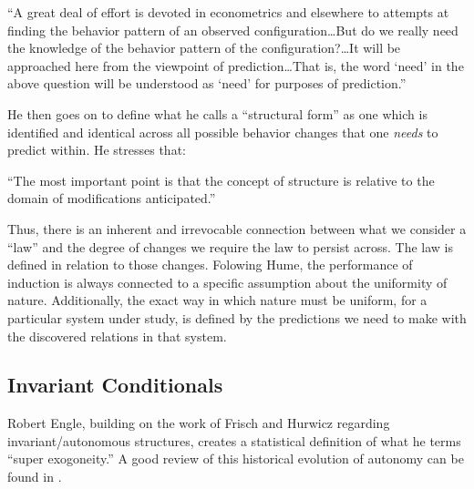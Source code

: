 \documentclass[a4paper,12pt]{article}
\begin{document}
\begin{displayquote}
``A great deal of effort is devoted in econometrics and elsewhere to attempts at finding the behavior pattern of an observed configuration\ldots But do we really need the knowledge of the behavior pattern of the configuration?\ldots It will be approached here from the viewpoint of prediction\ldots That is, the word `need' in the above question will be understood as `need' for purposes of prediction.''
\end{displayquote}


He then goes on to define what he calls a ``structural form'' as one which is identified and identical across all possible behavior changes that one \textit{needs} to predict within. He stresses that: 

\begin{displayquote}
``The most important point is that the concept of structure is relative to the domain of modifications anticipated.''  
\end{displayquote}

Thus, there is an inherent and irrevocable connection between what we consider a ``law'' and the degree of changes we require the law to persist across. The law is defined in relation to those changes. Folowing Hume, the performance of induction is always connected to a specific assumption about the uniformity of nature. Additionally, the exact way in which nature must be uniform, for a particular system under study, is defined by the predictions we need to make with the discovered relations in that system. 



\subsection*{Invariant Conditionals}

Robert Engle, building on the work of Frisch and Hurwicz regarding invariant/autonomous structures, creates a statistical definition of what he terms ``super exogoneity.'' A good review of this historical evolution of autonomy can be found in \cite{Aldrich1989}.
\end{document}
